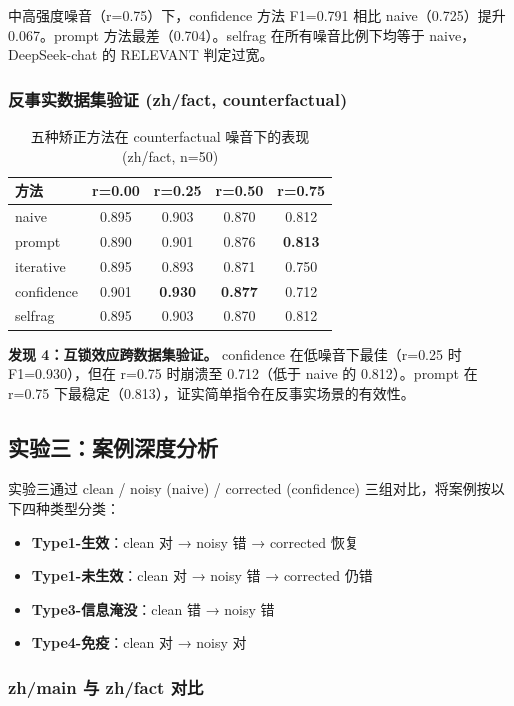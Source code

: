 \documentclass[UTF8,zihao=-4]{ctexart}
\begin{document}
中高强度噪音（r=0.75）下，confidence 方法 F1=0.791 相比 naive（0.725）提升 0.067。prompt 方法最差（0.704）。selfrag 在所有噪音比例下均等于 naive，DeepSeek-chat 的 RELEVANT 判定过宽。

\subsubsection{反事实数据集验证 (zh/fact, counterfactual)}

\begin{table}[H]
  \centering
  \caption{五种矫正方法在 counterfactual 噪音下的表现 (zh/fact, n=50)}
  \begin{tabular}{lcccc}
    \toprule
    方法 & r=0.00 & r=0.25 & r=0.50 & r=0.75 \\
    \midrule
    naive & 0.895 & 0.903 & 0.870 & 0.812 \\
    prompt & 0.890 & 0.901 & 0.876 & \textbf{0.813} \\
    iterative & 0.895 & 0.893 & 0.871 & 0.750 \\
    confidence & 0.901 & \textbf{0.930} & \textbf{0.877} & 0.712 \\
    selfrag & 0.895 & 0.903 & 0.870 & 0.812 \\
    \bottomrule
  \end{tabular}
\end{table}

\textbf{发现 4：互锁效应跨数据集验证。} confidence 在低噪音下最佳（r=0.25 时 F1=0.930），但在 r=0.75 时崩溃至 0.712（低于 naive 的 0.812）。prompt 在 r=0.75 下最稳定（0.813），证实简单指令在反事实场景的有效性。

\subsection{实验三：案例深度分析}

实验三通过 clean / noisy (naive) / corrected (confidence) 三组对比，将案例按以下四种类型分类：
\begin{itemize}[leftmargin=2.5em]
  \item \textbf{Type1-生效}：clean 对 → noisy 错 → corrected 恢复
  \item \textbf{Type1-未生效}：clean 对 → noisy 错 → corrected 仍错
  \item \textbf{Type3-信息淹没}：clean 错 → noisy 错
  \item \textbf{Type4-免疫}：clean 对 → noisy 对
\end{itemize}

\subsubsection{zh/main 与 zh/fact 对比}
\end{document}
